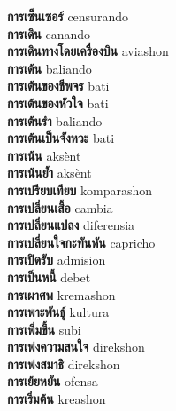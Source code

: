 \textbf{ การเซ็นเซอร์  } censurando \\
\textbf{ การเดิน  } canando \\
\textbf{ การเดินทางโดยเครื่องบิน  } aviashon \\
\textbf{ การเต้น  } baliando \\
\textbf{ การเต้นของชีพจร  } bati \\
\textbf{ การเต้นของหัวใจ  } bati \\
\textbf{ การเต้นรำ  } baliando \\
\textbf{ การเต้นเป็นจังหวะ  } bati \\
\textbf{ การเน้น  } aksènt \\
\textbf{ การเน้นย้ำ  } aksènt \\
\textbf{ การเปรียบเทียบ  } komparashon \\
\textbf{ การเปลี่ยนเสื้อ  } cambia \\
\textbf{ การเปลี่ยนแปลง  } diferensia \\
\textbf{ การเปลี่ยนใจกะทันหัน  } capricho \\
\textbf{ การเปิดรับ  } admision \\
\textbf{ การเป็นหนี้  } debet \\
\textbf{ การเผาศพ  } kremashon \\
\textbf{ การเพาะพันธุ์  } kultura \\
\textbf{ การเพิ่มขึ้น  } subi \\
\textbf{ การเพ่งความสนใจ  } direkshon \\
\textbf{ การเพ่งสมาธิ  } direkshon \\
\textbf{ การเย้ยหยัน  } ofensa \\
\textbf{ การเริ่มต้น  } kreashon \\
